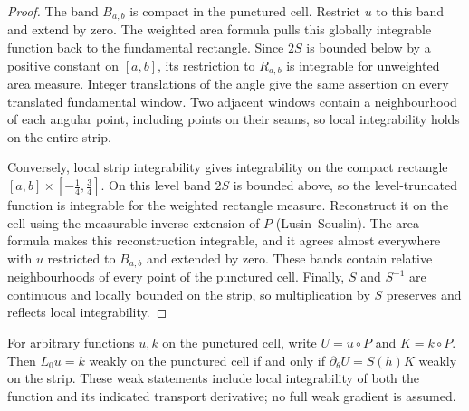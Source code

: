 \begin{proof}
\leanok
The band $B_{a,b}$ is compact in the punctured cell. Restrict $u$ to this
band and extend by zero. The weighted area formula pulls this globally
integrable function back to the fundamental rectangle. Since $2S$ is
bounded below by a positive constant on $[a,b]$, its restriction to
$R_{a,b}$ is integrable for unweighted area measure. Integer translations
of the angle give the same assertion on every translated fundamental
window. Two adjacent windows contain a neighbourhood of each angular
point, including points on their seams, so local integrability holds on
the entire strip.

Conversely, local strip integrability gives integrability on the compact
rectangle $[a,b]\times[-\frac14,\frac34]$. On this level band $2S$ is
bounded above, so the level-truncated function is integrable for the
weighted rectangle measure. Reconstruct it on the cell using the
measurable inverse extension of $P$ (Lusin--Souslin). The area formula
makes this reconstruction integrable, and it agrees almost everywhere
with $u$ restricted to $B_{a,b}$ and extended by zero. These bands contain
relative neighbourhoods of every point of the punctured cell. Finally,
$S$ and $S^{-1}$ are continuous and locally bounded on the strip, so
multiplication by $S$ preserves and reflects local integrability.
\end{proof}

\begin{lemma}
\label{lem:action-angle-transport}
\leanok
For arbitrary functions $u,k$ on the punctured cell, write $U=u\circ P$
and $K=k\circ P$. Then $L_0u=k$ weakly on the punctured cell if and only if
$\partial_\theta U=S(h)K$ weakly on the strip. These weak statements
include local integrability of both the function and its indicated
transport derivative; no full weak gradient is assumed.
\end{lemma}

